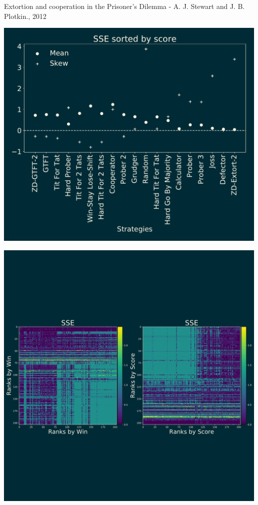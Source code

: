 \documentclass{beamer}
\begin{document}
\begin{frame}
    \begin{center}
        \normalsize{Extortion and cooperation in the Prisoner's Dilemma -
        A. J. Stewart and J. B. Plotkin., 2012}

        \vspace{.5cm}
        \includegraphics[width=.7\textwidth]{static/validation_plot}
    \end{center}
\end{frame}

\begin{frame}
    \begin{center}
        \vspace{-1cm}
        \includegraphics[width=\textwidth]{static/results_sserror}
    \end{center}
\end{frame}
\end{document}
